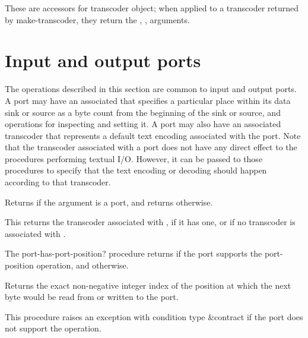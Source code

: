 \begin{entry}{%
}

These are accessors for transcoder object; when applied to a
transcoder returned by {\cf make-transcoder}, they return the
, ,  arguments.
\end{entry}

\section{Input and output ports}

The operations described in this section are common to input and
output ports.  A port may have an associated  that
specifies a particular place within its data sink or source as a byte
count from the beginning of the sink or source, and operations for
inspecting and setting it.  A port may also have an associated
transcoder that represents a default text encoding associated with the
port.  Note that the transcoder associated with a port does not have
any direct effect to the procedures performing textual I/O.  However,
it can be passed to those procedures to specify that the text encoding
or decoding should happen according to that transcoder.

\begin{entry}{%
}
   
Returns \schtrue{} if the argument is a port, and returns \schfalse{}
otherwise.
\end{entry}

\begin{entry}{%
}

This returns the transcoder associated with , if it has one,
or \schfalse{} if no transcoder is associated with .
\end{entry}

\begin{entry}{%
}

The {\cf port-has-port-position?} procedure returns \schtrue{} if the
port supports the {\cf port-position} operation, and \schfalse{}
otherwise.

Returns the exact non-negative integer index of the position at which the
next byte would be read from or written to the port.
   
This procedure raises an exception with condition type {\cf\&contract}
if the port does not support the operation.
\end{entry}   

